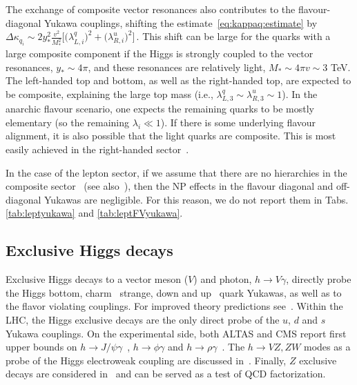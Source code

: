 \documentclass[../report.tex]{subfiles}
\begin{document}
The exchange of composite vector resonances also contributes to the
flavour-diagonal Yukawa couplings, shifting the
estimate~\eqref{eq:kappaq:estimate} by 
$\Delta \kappa_{q_i}\sim 2 y_*^2 \frac{v^2}{M_*^2}
\Big[\big(\lambda_{L,i}^q\big)^2+ \big(\lambda_{R,i}^u\big)^2\Big] \,$.
This shift can be large for the quarks with a large composite
component if the Higgs is strongly coupled to the vector resonances,
$y_*\sim 4\pi$, and these resonances are relatively light, $M_*\sim
4\pi v\sim 3$ TeV. The left-handed top and bottom, as well as the
right-handed top, are expected to be composite, explaining the large
top mass (i.e., $\lambda_{L,3}^q\sim \lambda_{R,3}^u\sim 1$). In the
anarchic flavour scenario, one expects the remaining quarks to be
mostly elementary (so the remaining $\lambda_i\ll 1$).  
If there is some underlying flavour alignment, it is also possible that
the light quarks are composite. This is most easily achieved in the
right-handed sector~\cite{Redi:2011zi, Redi:2012uj,
  Delaunay:2013iia}.

In the case of the lepton sector, if we assume that there are no
hierarchies in the composite sector~\cite{Redi:2013pga} (see also~\cite{Csaki:2008qq,delAguila:2010vg,Hagedorn:2011un,Hagedorn:2011pw}), then the NP
effects in the flavour diagonal and off-diagonal Yukawas are
negligible. For this reason, we do not report them in Tabs. \ref{tab:leptyukawa} and \ref{tab:leptFVyukawa}.


\subsection{Exclusive Higgs decays}

Exclusive Higgs decays to a vector meson ($V$) and photon, $h\to V\gamma$, directly probe the Higgs bottom, charm~\cite{Bodwin:2013gca,Bodwin:2014bpa} strange, down and up~\cite{Kagan:2014ila} quark Yukawas, as well as to the flavor violating couplings. 
For improved theory predictions see~\cite{Koenig:2015pha}.
Within the LHC, the Higgs exclusive decays are the only direct probe of the $u$, $d$ and $s$ Yukawa couplings. 
On the experimental side, both ALTAS and CMS report first upper bounds on $h\to J/\psi\gamma$~\cite{Aad:2015sda,Khachatryan:2015lga}, $h\to\phi\gamma$ and $h\to\rho\gamma$~\cite{Aaboud:2016rug,Aaboud:2017xnb}. 
The $h \to VZ, ZW$ modes as a probe of the Higgs electroweak coupling are discussed  in~\cite{Isidori:2013cla}. 
Finally, $Z$ exclusive decays are considered in~\cite{Grossmann:2015lea,Alte:2015dpo} and can be served as a test of QCD factorization. 
\end{document}
